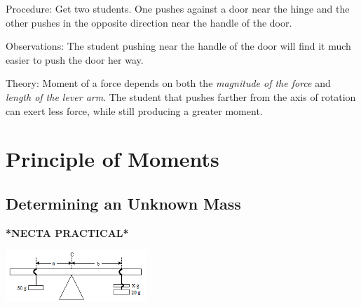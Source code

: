 \begin{multicols}{2}
\begin{description*}
\item[Procedure:]{Get two students. One pushes against a door near the hinge and the other pushes in the opposite direction near the handle of the door.}
\item[Observations:]{The student pushing near the handle of the door will find it much easier to push the door her way.}
\item[Theory:]{Moment of a force depends on both the \emph{magnitude of the force} and \emph{length of the lever arm}. The student that pushes farther from the axis of rotation can exert less force, while still producing a greater moment.}
\end{description*}


\section*{Principle of Moments}


\subsection{Determining an Unknown Mass}
\textbf{*NECTA PRACTICAL*}

\begin{center}
\includegraphics[width=0.4\textwidth]{./img/unknown-mass.png}
\end{center}


\end{multicols}
